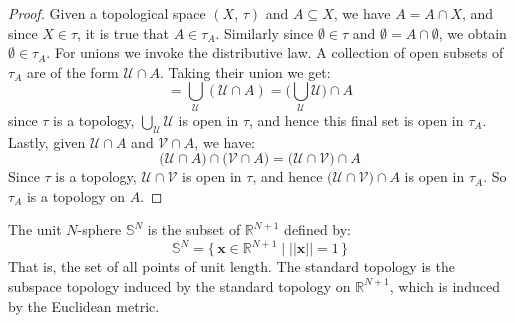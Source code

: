 \documentclass{article}
\theoremstyle{plain}
\theoremstyle{normal}
\newenvironment{example}{%
    \pushQED{\qed}\renewcommand{\qedsymbol}{$\blacksquare$}\examplex%
}{%
    \popQED\endexamplex%
}
\begin{document}
            \begin{proof}
                Given a topological space $(X,\,\tau)$ and $A\subseteq{X}$,
                we have $A=A\cap{X}$, and since $X\in\tau$, it is true that
                $A\in\tau_{A}$. Similarly since $\emptyset\in\tau$ and
                $\emptyset=A\cap\emptyset$, we obtain $\emptyset\in\tau_{A}$.
                For unions we invoke the distributive law. A collection of open
                subsets of $\tau_{A}$ are of the form $\mathcal{U}\cap{A}$.
                Taking their union we get:
                \begin{equation}
                    =\bigcup_{\mathcal{U}}(\mathcal{U}\cap{A})
                    =\Big(\bigcup_{\mathcal{U}}\mathcal{U}\Big)\cap{A}
                \end{equation}
                since $\tau$ is a topology, $\bigcup_{\mathcal{U}}\mathcal{U}$
                is open in $\tau$, and hence this final set is open
                in $\tau_{A}$. Lastly, given $\mathcal{U}\cap{A}$ and
                $\mathcal{V}\cap{A}$, we have:
                \begin{equation}
                    \big(\mathcal{U}\cap{A}\big)\cap\big(\mathcal{V}\cap{A}\big)
                    =\big(\mathcal{U}\cap\mathcal{V}\big)\cap{A}
                \end{equation}
                Since $\tau$ is a topology, $\mathcal{U}\cap\mathcal{V}$ is
                open in $\tau$, and hence
                $\big(\mathcal{U}\cap\mathcal{V}\big)\cap{A}$ is open in
                $\tau_{A}$. So $\tau_{A}$ is a topology on $A$.
            \end{proof}
            \begin{example}
                The unit $N$-sphere $\mathbb{S}^{N}$ is the subset of
                $\mathbb{R}^{N+1}$ defined by:
                \begin{equation}
                    \mathbb{S}^{N}
                    =\{\,\mathbf{x}\in\mathbb{R}^{N+1}\;|\;||\mathbf{x}||=1\,\}
                \end{equation}
                That is, the set of all points of unit length. The standard
                topology is the subspace topology induced by the standard
                topology on $\mathbb{R}^{N+1}$, which is induced by the
                Euclidean metric.
            \end{example}
\end{document}
